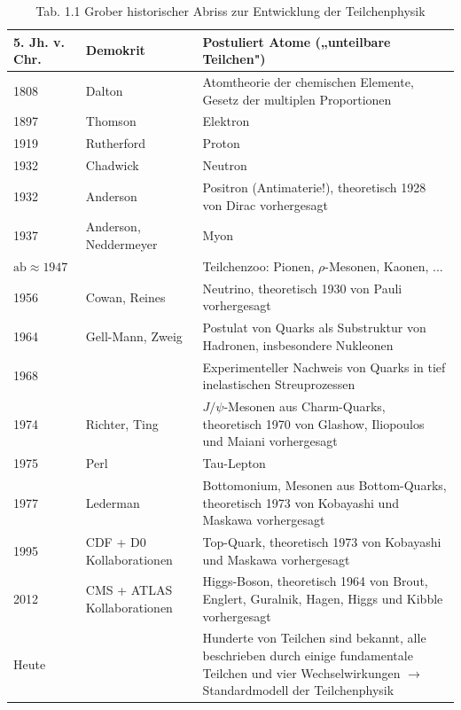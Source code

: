\documentclass[10pt, letterpaper]{article}
\begin{document}
\begin{table}[h]
\begin{center}

\caption{Tab. 1.1 Grober historischer Abriss zur Entwicklung der Teilchenphysik}
\begin{tabular}{|l|l|l|}
\hline
5. Jh. v. Chr. & Demokrit & Postuliert Atome („unteilbare Teilchen") \\
\hline
1808 & Dalton & Atomtheorie der chemischen Elemente, Gesetz der multiplen Proportionen \\
\hline
1897 & Thomson & Elektron \\
\hline
1919 & Rutherford & Proton \\
\hline
1932 & Chadwick & Neutron \\
\hline
1932 & Anderson & Positron (Antimaterie!), theoretisch 1928 von Dirac vorhergesagt \\
\hline
1937 & Anderson, Neddermeyer & Myon \\
\hline
$\mathrm{ab} \approx 1947$ &  & Teilchenzoo: Pionen, $\rho$-Mesonen, Kaonen, ... \\
\hline
1956 & Cowan, Reines & Neutrino, theoretisch 1930 von Pauli vorhergesagt \\
\hline
1964 & Gell-Mann, Zweig & Postulat von Quarks als Substruktur von Hadronen, insbesondere Nukleonen \\
\hline
1968 &  & Experimenteller Nachweis von Quarks in tief inelastischen Streuprozessen \\
\hline
1974 & Richter, Ting & $J / \psi$-Mesonen aus Charm-Quarks, theoretisch 1970 von Glashow, Iliopoulos und Maiani vorhergesagt \\
\hline
1975 & Perl & Tau-Lepton \\
\hline
1977 & Lederman & Bottomonium, Mesonen aus Bottom-Quarks, theoretisch 1973 von Kobayashi und Maskawa vorhergesagt \\
\hline
1995 & CDF + D0 Kollaborationen & Top-Quark, theoretisch 1973 von Kobayashi und Maskawa vorhergesagt \\
\hline
2012 & CMS + ATLAS Kollaborationen & Higgs-Boson, theoretisch 1964 von Brout, Englert, Guralnik, Hagen, Higgs und Kibble vorhergesagt \\
\hline
Heute &  & Hunderte von Teilchen sind bekannt, alle beschrieben durch einige fundamentale Teilchen und vier Wechselwirkungen $\rightarrow$ Standardmodell der Teilchenphysik \\
\hline
\end{tabular}
\end{center}
\end{table}
\end{document}
